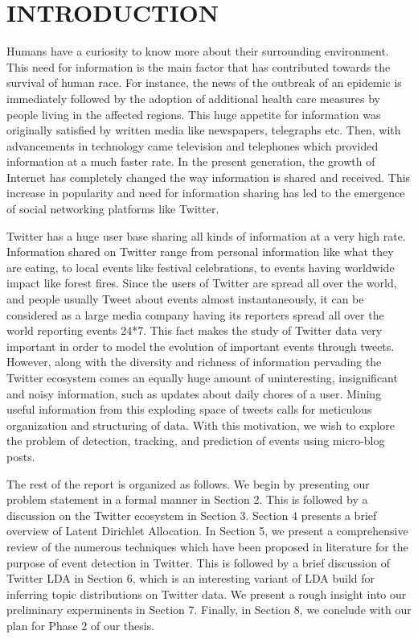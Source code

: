 \section{\uppercase{Introduction}}
Humans have a curiosity to know more about their surrounding environment. This need for information is the main factor that has contributed towards the survival of human race. For instance, the news of the outbreak of an epidemic is immediately followed by the adoption of additional health care measures by people living in the affected regions. This huge appetite for information was originally satisfied by written media like newspapers, telegraphs etc. Then, with advancements in technology came television and telephones which provided information at a much faster rate. In the present generation, the growth of Internet has completely changed the way information is shared and received. This increase in popularity and need for information sharing has led to the emergence of social networking platforms like Twitter.

Twitter has a huge user base sharing all kinds of information at a very high rate. Information shared on Twitter range from personal information like what they are eating, to local events like festival celebrations, to events having worldwide impact like forest fires. Since the users of Twitter are spread all over the world, and people usually Tweet about events almost instantaneously, it can be considered as a large media company having its reporters spread all over the world reporting events 24*7. This fact makes the study of Twitter data very important in order to model the evolution of important events through tweets. However, along with the diversity and richness of information pervading the Twitter ecosystem comes an equally huge amount of uninteresting, insignificant and noisy information, such as updates about daily chores of a user. Mining useful information from this exploding space of tweets calls for meticulous organization and structuring of data. With this motivation, we wish to explore the problem of detection, tracking, and prediction of events using micro-blog posts.

The rest of the report is organized as follows. We begin by presenting our problem statement in a formal manner in Section 2. This is followed by a discussion on the Twitter ecosystem in Section 3. Section 4 presents a brief overview of Latent Dirichlet Allocation. In Section 5, we present a comprehensive review of the numerous techniques which have been proposed in literature for the purpose of event detection in Twitter. This is followed by a brief discussion of Twitter LDA in Section 6, which is an interesting variant of LDA build for inferring topic distributions on Twitter data. We present a rough insight into our preliminary experminents in Section 7. Finally, in Section 8, we conclude with our plan for Phase 2 of our thesis.